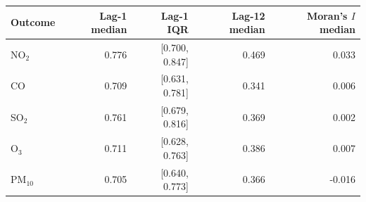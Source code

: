\begin{tabular}{lrrrr}
\toprule
Outcome & Lag-1 median & Lag-1 IQR & Lag-12 median & Moran's $I$ median \\
\midrule
NO$_2$ & 0.776 & [0.700, 0.847] & 0.469 & 0.033 \\
CO & 0.709 & [0.631, 0.781] & 0.341 & 0.006 \\
SO$_2$ & 0.761 & [0.679, 0.816] & 0.369 & 0.002 \\
O$_3$ & 0.711 & [0.628, 0.763] & 0.386 & 0.007 \\
PM$_{10}$ & 0.705 & [0.640, 0.773] & 0.366 & -0.016 \\
\bottomrule
\end{tabular}
